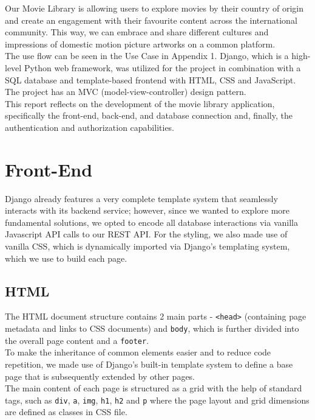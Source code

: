 \documentclass[letterpaper,twocolumn]{article}
\begin{document}
Our Movie Library is allowing users to explore movies by their country of origin and create an engagement with their favourite content across the international community. This way, we can embrace and share different cultures and impressions of domestic motion picture artworks on a common platform. \\

The use flow can be seen in the Use Case in Appendix 1. Django, which is a high-level Python web framework, was utilized for the project in combination with a SQL database and template-based frontend with HTML, CSS and JavaScript. The project has an MVC (model-view-controller) design pattern. \\

This report reflects on the development of the movie library application, specifically the front-end, back-end, and database connection and, finally, the authentication and authorization capabilities. 

\newpage{}

\section{Front-End}

Django already features a very complete template system that seamlessly interacts with its backend service; however, since we wanted to explore more fundamental solutions, we opted to encode all database interactions via vanilla Javascript API calls to our REST API. For the styling, we also made use of vanilla CSS, which is dynamically imported via Django's templating system, which we use to build each page.

\subsection{HTML}

The HTML document structure contains 2 main parts - \texttt{<head>} (containing page metadata and links to CSS documents) and \texttt{body}, which is further divided into the overall page content and a \texttt{footer}. \\

To make the inheritance of common elements easier and to reduce code repetition, we made use of Django's built-in template system to define a base page that is subsequently extended by other pages. \\

The main content of each page is structured as a grid with the help of standard tags, such as \texttt{div}, \texttt{a}, \texttt{img}, \texttt{h1}, \texttt{h2} and \texttt{p} where the page layout and grid dimensions are defined as classes in CSS file.\\
\end{document}
